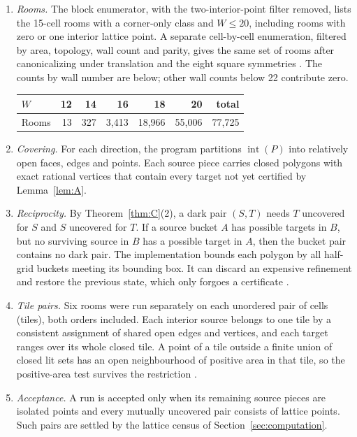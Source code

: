 \documentclass[11pt]{article}
\theoremstyle{definition}
\theoremstyle{remark}
\newcommand{\interior}{\operatorname{int}}
\begin{document}
\begin{enumerate}
\item \emph{Rooms.} The block enumerator, with the two-interior-point
filter removed, lists the 15-cell rooms with a corner-only class and
$W\le20$, including rooms with zero or one interior lattice point. A
separate cell-by-cell enumeration, filtered by area, topology, wall count
and parity, gives the same set of rooms after canonicalizing under
translation and the eight square symmetries \cite{offgrid}. The counts by
wall number are below; other wall counts below 22 contribute zero.
\begin{center}
\begin{tabular}{lrrrrrr}
\toprule
$W$ & 12 & 14 & 16 & 18 & 20 & total\\
\midrule
Rooms & 13 & 327 & 3{,}413 & 18{,}966 & 55{,}006 & 77{,}725\\
\bottomrule
\end{tabular}
\end{center}
\item \emph{Covering.} For each direction, the program partitions
$\interior(P)$ into relatively open faces, edges and points. Each source
piece carries closed polygons with exact rational vertices that contain
every target not yet certified by Lemma~\ref{lem:A}.
\item \emph{Reciprocity.} By Theorem~\ref{thm:C}(2), a dark pair $(S,T)$
needs $T$ uncovered for $S$ and $S$ uncovered for $T$. If a source bucket
$A$ has possible targets in $B$, but no surviving source in $B$ has a
possible target in $A$, then the bucket pair contains no dark pair. The
implementation bounds each polygon by all half-grid buckets meeting its
bounding box. It can discard an expensive refinement and restore the
previous state, which only forgoes a certificate \cite[step 3]{offgrid}.
\item \emph{Tile pairs.} Six rooms were run separately on each unordered
pair of cells (tiles), both orders included. Each interior source belongs
to one tile by a consistent assignment of shared open edges and vertices,
and each target ranges over its whole closed tile. A point of a tile
outside a finite union of closed lit sets has an open neighbourhood of
positive area in that tile, so the positive-area test survives the
restriction \cite[step 4]{offgrid}.
\item \emph{Acceptance.} A run is accepted only when its remaining source
pieces are isolated points and every mutually uncovered pair consists of
lattice points. Such pairs are settled by the lattice census of
Section~\ref{sec:computation}.
\end{enumerate}
\end{document}
